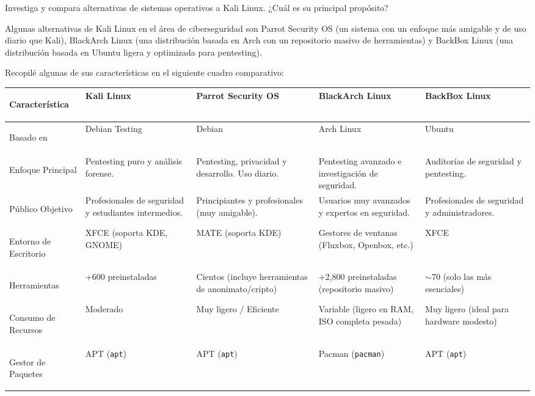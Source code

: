 Investiga y compara alternativas de sistemas operativos a Kali Linux. ¿Cuál es su principal propósito?

Algunas alternativas de Kali Linux en el área de ciberseguridad son Parrot Security OS (un sistema con un enfoque más amigable y de uso diario que Kali), BlackArch Linux (una distribución basada en Arch con un repositorio masivo de herramientas) y BackBox Linux (una distribución basada en Ubuntu ligera y optimizada para pentesting).

Recopilé algunas de sus características en el siguiente cuadro comparativo:

\renewcommand{\arraystretch}{1.3}
\begin{table}[H]
    \centering
    \footnotesize
    \begin{tabularx}{\textwidth}{|>{\bfseries\raggedright\arraybackslash}p{2.8cm}|Y|Y|Y|Y|}
    \hline
    \textbf{Característica} & \textbf{Kali Linux} & \textbf{Parrot Security OS} & \textbf{BlackArch Linux} & \textbf{BackBox Linux} \\
    \hline
    Basado en & Debian Testing & Debian & Arch Linux & Ubuntu \\
    \hline
    Enfoque Principal & Pentesting puro y análisis forense. & Pentesting, privacidad y desarrollo. Uso diario. & Pentesting avanzado e investigación de seguridad. & Auditorías de seguridad y pentesting. \\
    \hline
    Público Objetivo & Profesionales de seguridad y estudiantes intermedios. & Principiantes y profesionales (muy amigable). & Usuarios muy avanzados y expertos en seguridad. & Profesionales de seguridad y administradores. \\
    \hline
    Entorno de Escritorio & XFCE (soporta KDE, GNOME) & MATE (soporta KDE) & Gestores de ventanas (Fluxbox, Openbox, etc.) & XFCE \\
    \hline
    Herramientas & +600 preinstaladas & Cientos (incluye herramientas de anonimato/cripto) & +2,800 preinstaladas (repositorio masivo) & $\sim$70 (solo las más esenciales) \\
    \hline
    Consumo de Recursos & Moderado & Muy ligero / Eficiente & Variable (ligero en RAM, ISO completa pesada) & Muy ligero (ideal para hardware modesto) \\
    \hline
    Gestor de Paquetes & APT (\texttt{apt}) & APT (\texttt{apt}) & Pacman (\texttt{pacman}) & APT (\texttt{apt}) \\
    \end{tabularx}
\end{table}


